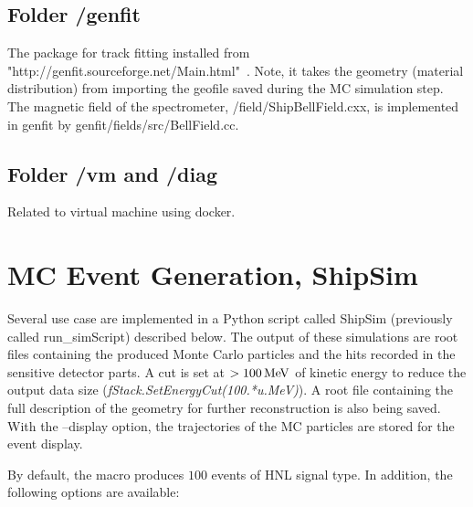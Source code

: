 \documentclass[12pt,a4paper]{article}
\begin{document}
\subsection{Folder /genfit}
The package for track fitting installed from "http://genfit.sourceforge.net/Main.html"~\cite{Höppner2010518}. Note, it takes the geometry (material distribution) from importing the geofile saved during the MC simulation step. The magnetic field of the spectrometer, /field/ShipBellField.cxx, is implemented in genfit by genfit/fields/src/BellField.cc. 

\subsection{Folder /vm and /diag}
Related to virtual machine using docker.

\section{MC Event Generation, ShipSim}
Several use case are implemented in a Python script called ShipSim (previously called run\_simScript) described below. The output of these simulations are root files containing the produced Monte Carlo particles and the hits recorded in the sensitive detector parts. A cut is set at $>100\mathrm{\,Me\kern -0.1em V}$ of kinetic energy to reduce the output data size ({\it fStack.SetEnergyCut(100.*u.MeV)}). A root file containing the full description of the geometry for further reconstruction is also being saved. With the --display option, the trajectories of the MC particles are stored for the event display. 

By default, the macro produces $100$ events of HNL signal type. In addition, the following options are available:
\end{document}
